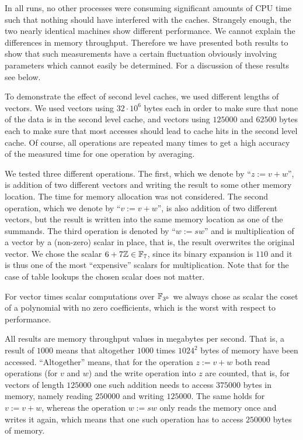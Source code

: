 In all runs, no other processes
were consuming significant amounts of CPU time such that nothing should
have interfered with the caches. Strangely enough, the two nearly identical
machines show different performance. 
We cannot explain the differences in memory throughput.
Therefore we have presented both
results to show that such measurements have a certain fluctuation
obviously involving parameters which cannot easily be determined.
For a discussion of these results see below.

To demonstrate the effect of second level caches, we used different 
lengths of vectors. We used vectors using $32 \cdot 10^6$ bytes each in
order to make sure that none of the data is in the second level cache,
and vectors using $125000$ and $62500$ bytes each to make sure that
most accesses should lead to cache hits in the second level cache.
Of course, all operations are repeated many times to get a high accuracy
of the measured time for one operation by averaging.

We tested three different operations. The first, which we denote by 
``$z := v+w$'', is addition of two different vectors and writing the
result to some other memory location. The time for memory allocation
was not considered. The second operation, which we denote by 
``$v := v+w$'', is also addition of two different vectors, but the result
is written into the same memory location as one of the summands.
The third operation is denoted by ``$w := sw$'' and is multiplication
of a vector by a (non-zero) scalar in place, that is, the result overwrites
the original vector. We chose the scalar $6 + 7\mathbb{Z} \in \mathbb{F}_7$, since its
binary expansion is $110$ and it is thus one of the most ``expensive'' scalars
for multiplication. Note that for the case of table lookups the chosen
scalar does not matter.

For vector times scalar computations over $\mathbb{F}_{3^k}$ we always chose as
scalar the coset of a polynomial with no zero coefficients, which is
the worst with respect to performance.

All results are memory throughput values in megabytes per second. 
That is, a result of $1000$ means that altogether $1000$ times
$1024^2$ bytes of memory have been accessed. ``Altogether'' means, that for
the operation $z := v+w$ both read operations (for $v$ and $w$) and the
write operation into $z$ are counted, that is, for vectors of length
$125000$ one such addition needs to access $375000$ bytes in memory,
namely reading $250000$ and writing $125000$. The same holds for
$v := v + w$, whereas the operation $w := sw$ only reads the memory once
and writes it again, which means that one such operation has to access
$250000$ bytes of memory.

